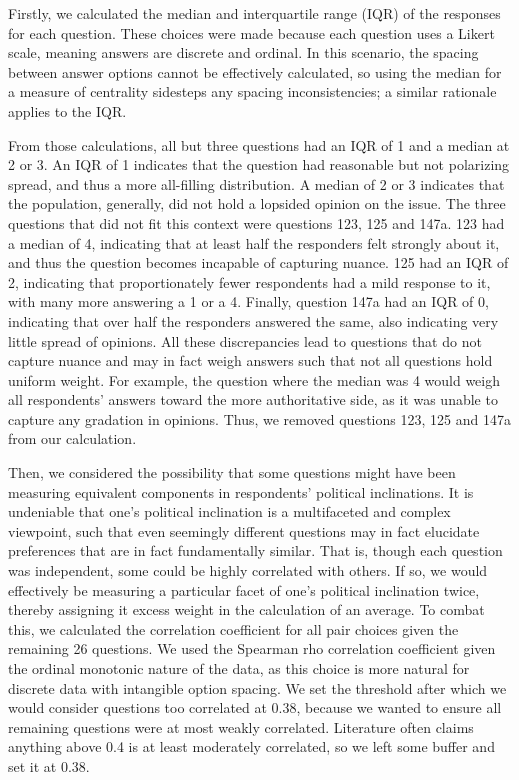 \documentclass[
]{article}
\begin{document}
Firstly, we calculated the median and interquartile range (IQR) of the
responses for each question. These choices were made because each
question uses a Likert scale, meaning answers are discrete and ordinal.
In this scenario, the spacing between answer options cannot be
effectively calculated, so using the median for a measure of centrality
sidesteps any spacing inconsistencies; a similar rationale applies to
the IQR.

From those calculations, all but three questions had an IQR of 1 and a
median at 2 or 3. An IQR of 1 indicates that the question had reasonable
but not polarizing spread, and thus a more all-filling distribution. A
median of 2 or 3 indicates that the population, generally, did not hold
a lopsided opinion on the issue. The three questions that did not fit
this context were questions 123, 125 and 147a. 123 had a median of 4,
indicating that at least half the responders felt strongly about it, and
thus the question becomes incapable of capturing nuance. 125 had an IQR
of 2, indicating that proportionately fewer respondents had a mild
response to it, with many more answering a 1 or a 4. Finally, question
147a had an IQR of 0, indicating that over half the responders answered
the same, also indicating very little spread of opinions. All these
discrepancies lead to questions that do not capture nuance and may in
fact weigh answers such that not all questions hold uniform weight. For
example, the question where the median was 4 would weigh all
respondents' answers toward the more authoritative side, as it was
unable to capture any gradation in opinions. Thus, we removed questions
123, 125 and 147a from our calculation.

Then, we considered the possibility that some questions might have been
measuring equivalent components in respondents' political inclinations.
It is undeniable that one's political inclination is a multifaceted and
complex viewpoint, such that even seemingly different questions may in
fact elucidate preferences that are in fact fundamentally similar. That
is, though each question was independent, some could be highly
correlated with others. If so, we would effectively be measuring a
particular facet of one's political inclination twice, thereby assigning
it excess weight in the calculation of an average. To combat this, we
calculated the correlation coefficient for all pair choices given the
remaining 26 questions. We used the Spearman rho correlation coefficient
given the ordinal monotonic nature of the data, as this choice is more
natural for discrete data with intangible option spacing. We set the
threshold after which we would consider questions too correlated at
0.38, because we wanted to ensure all remaining questions were at most
weakly correlated. Literature often claims anything above 0.4 is at
least moderately correlated, so we left some buffer and set it at 0.38.
\end{document}

